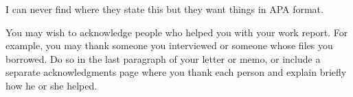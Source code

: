 \documentclass[12pt]{article}
\begin{document}
I can never find where they state this but they want things in APA format. 





You may wish to acknowledge people who helped you with your work report. For example, you may thank someone you interviewed or someone whose files you borrowed. Do so in the last paragraph of your letter or memo, or include a separate acknowledgments page where you thank each person and explain briefly how he or she helped.
\end{document}

